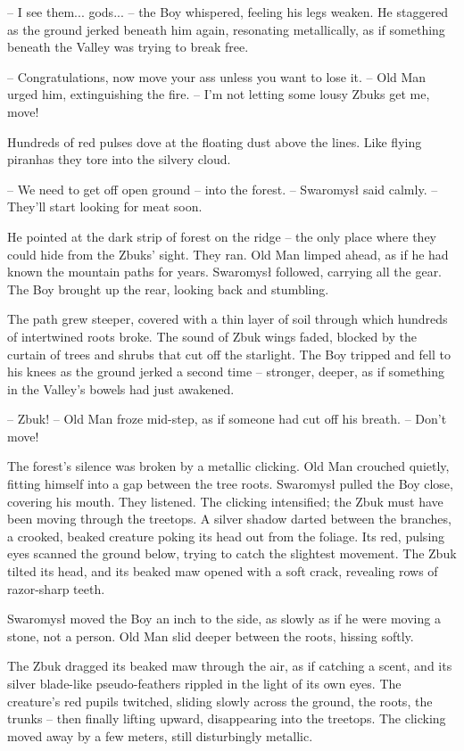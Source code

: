 \par\indent-- I see them... gods... -- the Boy whispered, feeling his legs weaken. He staggered as the ground jerked beneath him again, resonating metallically, as if something beneath the Valley was trying to break free. 
\par\indent-- Congratulations, now move your ass unless you want to lose it. -- Old Man urged him, extinguishing the fire. -- I'm not letting some lousy Zbuks get me, move! 
\par\indent Hundreds of red pulses dove at the floating dust above the lines. Like flying piranhas they tore into the silvery cloud. 
\par\noindent-- We need to get off open ground -- into the forest. -- Swaromysł said calmly. -- They'll start looking for meat soon. 
\par\indent He pointed at the dark strip of forest on the ridge -- the only place where they could hide from the Zbuks' sight. They ran. Old Man limped ahead, as if he had known the mountain paths for years. Swaromysł followed, carrying all the gear. The Boy brought up the rear, looking back and stumbling. 
\par\indent The path grew steeper, covered with a thin layer of soil through which hundreds of intertwined roots broke. The sound of Zbuk wings faded, blocked by the curtain of trees and shrubs that cut off the starlight. The Boy tripped and fell to his knees as the ground jerked a second time -- stronger, deeper, as if something in the Valley's bowels had just awakened. 
\par\noindent-- Zbuk! -- Old Man froze mid-step, as if someone had cut off his breath. -- Don't move! 
\par\indent The forest's silence was broken by a metallic clicking. Old Man crouched quietly, fitting himself into a gap between the tree roots. Swaromysł pulled the Boy close, covering his mouth. They listened. The clicking intensified; the Zbuk must have been moving through the treetops. A silver shadow darted between the branches, a crooked, beaked creature poking its head out from the foliage. Its red, pulsing eyes scanned the ground below, trying to catch the slightest movement. The Zbuk tilted its head, and its beaked maw opened with a soft crack, revealing rows of razor-sharp teeth. 
\par\indent Swaromysł moved the Boy an inch to the side, as slowly as if he were moving a stone, not a person. Old Man slid deeper between the roots, hissing softly. 
\par\indent The Zbuk dragged its beaked maw through the air, as if catching a scent, and its silver blade-like pseudo-feathers rippled in the light of its own eyes. The creature's red pupils twitched, sliding slowly across the ground, the roots, the trunks -- then finally lifting upward, disappearing into the treetops. The clicking moved away by a few meters, still disturbingly metallic. 
